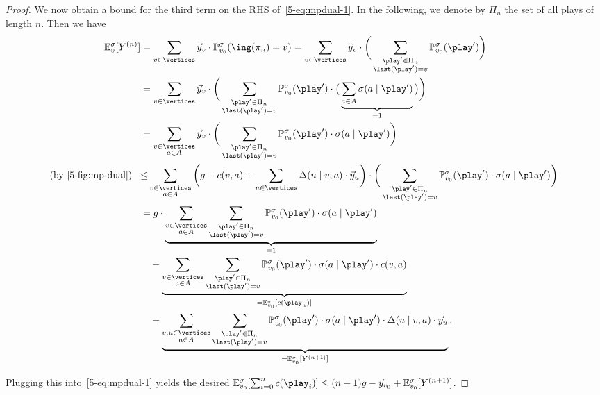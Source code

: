 \begin{proof}
\begingroup
\allowdisplaybreaks
\noindent
We now obtain a bound for the third term on the RHS of~\cref{5-eq:mpdual-1}. In the following, we denote by $\Pi_n$ the set of all plays of length $n$. Then we have
\begin{align*}
\expv^\sigma_v [Y^{(n)}]&= \sum_{v\in\vertices}  \vec{y}_v\cdot\probm^\sigma_{\vinit}(\ing(\pi_n)=v)
=\sum_{v\in\vertices}  \vec{y}_v\cdot \bigg(\sum_{\substack{\play'\in \Pi_n\\ \last(\play')=v}}\probm^\sigma_{\vinit}(\play') \bigg) \\
&=\sum_{v\in\vertices}  \vec{y}_v\cdot \bigg(\sum_{\substack{\play'\in \Pi_n\\ \last(\play')=v}}\probm^\sigma_{\vinit}(\play')\cdot\big(\underbrace{\sum_{a\in\actions}\sigma(a\mid \play')}_{=1} \big)\bigg) \\
&= \sum_{\substack{v\in\vertices\\ a \in \actions}}  \vec{y}_v\cdot \bigg(\sum_{\substack{\play'\in \Pi_n\\ \last(\play')=v}}\probm^\sigma_{\vinit}(\play')\cdot\sigma(a\mid \play')\bigg)\\
\text{(by~\cref{5-fig:mp-dual})}\hspace{3mm}
&{\leq}\sum_{\substack{v\in\vertices\\ a\in \actions}} \bigg( {g} -\colouring(v,a) + \sum_{u\in\vertices}\probTranFunc(u\mid v,a)\cdot  \vec{y}_u\bigg)\cdot\bigg(\sum_{\substack{\play'\in \Pi_n\\ \last(\play')=v}}\probm^\sigma_{\vinit}(\play')\cdot\sigma(a\mid \play')\bigg)\\
&= {g}\cdot\underbrace{\sum_{\substack{v\in\vertices\\ a\in \actions}}\sum_{\substack{\play'\in \Pi_n\\ \last(\play')=v}}\probm^\sigma_{\vinit}(\play')\cdot\sigma(a\mid \play')}_{=1}\\&\quad-\underbrace{\sum_{\substack{v\in\vertices\\ a\in \actions}}\sum_{\substack{\play'\in \Pi_n\\ \last(\play')=v}}\probm^\sigma_{\vinit}(\play')\cdot\sigma(a\mid \play')\cdot\colouring(v,a)}_{=\expv^\sigma_{\vinit}[\colouring(\play_n)]}\\
&\quad +\underbrace{\sum_{\substack{v,u\in \vertices\\ a \in \actions}}\sum_{\substack{\play'\in \Pi_n\\ \last(\play')=v}} \probm^\sigma_{\vinit}(\play')\cdot\sigma(a\mid \play')\cdot \probTranFunc(u\mid v,a)\cdot  \vec{y}_u}_{=\expv^\sigma_{\vinit}[Y^{(n+1)}]}.
\end{align*}
\endgroup

Plugging this into~\cref{5-eq:mpdual-1} yields the desired $\expv^\sigma_{\vinit}[\sum_{i=0}^{n}\colouring(\play_i)] \leq (n+1) {g}- \vec{y}_{\vinit} + \expv^\sigma_{\vinit}[Y^{(n+1)}]$. 
\end{proof}

